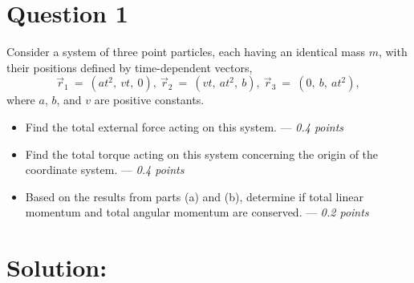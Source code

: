 \section*{Question 1}
Consider a system of three point particles, each having an identical mass $m$, with their positions defined by time-dependent vectors,
\begin{equation*}
    \vec r_{1}~=~(at^2,~vt,~0),~\vec r_{2}~=~(vt,~at^2,~b),~\vec r_{3}~=~(0,~b,~at^2), 
\end{equation*}
where $a$, $b$, and $v$ are positive constants.
\begin{itemize}
    \item[\textbf{a.}] Find the total external force acting on this system. --- \textit{0.4 points}
    \item[\textbf{b.}] Find the total torque acting on this system concerning the origin of the coordinate system. --- \textit{0.4 points}
    \item[\textbf{c.}] Based on the results from parts (a) and (b), determine if total linear momentum and total angular momentum are conserved. --- \textit{0.2 points}
\end{itemize}

\section*{Solution:}